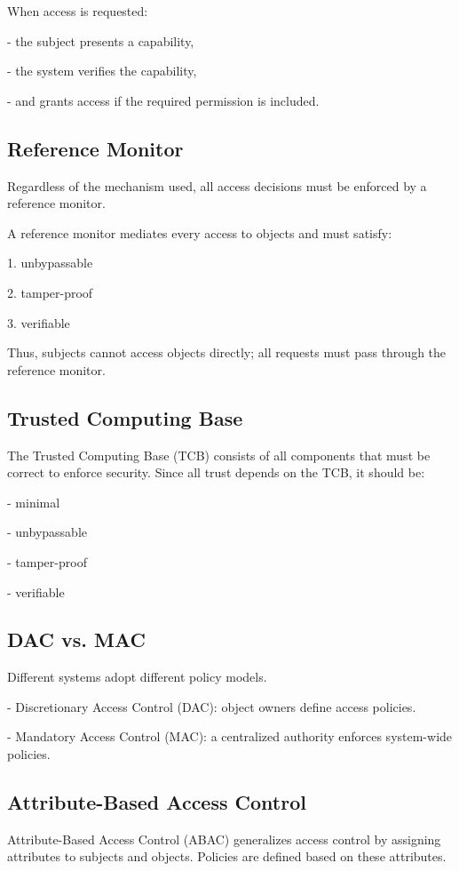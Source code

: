 When access is requested:

- the subject presents a capability,

- the system verifies the capability,

- and grants access if the required permission is included.

\subsection{Reference Monitor}
Regardless of the mechanism used, all access decisions must be enforced by a reference monitor.

A reference monitor mediates every access to objects and must satisfy:

1. unbypassable

2. tamper-proof

3. verifiable

Thus, subjects cannot access objects directly; all requests must pass through the reference monitor.

\subsection{Trusted Computing Base}
The Trusted Computing Base (TCB) consists of all components that must be correct to enforce security. Since all trust depends on the TCB, it should be:

- minimal

- unbypassable

- tamper-proof

- verifiable

\subsection{DAC vs. MAC}
Different systems adopt different policy models.

- Discretionary Access Control (DAC): object owners define access policies.

- Mandatory Access Control (MAC): a centralized authority enforces system-wide policies.

\subsection{Attribute-Based Access Control}
Attribute-Based Access Control (ABAC) generalizes access control by assigning attributes to subjects and objects. Policies are defined based on these attributes.

